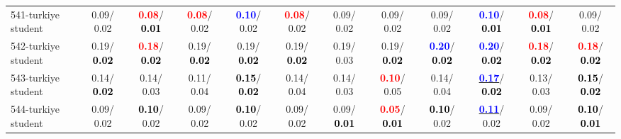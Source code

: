 \begin{table}[h]
\begin{center}
{\begin{tabular}{lc|c|c|c|c|c|c|c|c|c|c}
541-turkiye student &   0.09/  0.02 & \textcolor{red}{\textbf{  0.08}}/\textcolor{black}{\textbf{  0.01}} & \textcolor{red}{\textbf{  0.08}}/  0.02 & \textcolor{blue}{\textbf{  0.10}}/  0.02 & \textcolor{red}{\textbf{  0.08}}/  0.02 &   0.09/  0.02 &   0.09/  0.02 &   0.09/  0.02 & \textcolor{blue}{\textbf{  0.10}}/\textcolor{black}{\textbf{  0.01}} & \textcolor{red}{\textbf{  0.08}}/\textcolor{black}{\textbf{  0.01}} &   0.09/  0.02 \\
542-turkiye student &   0.19/\textcolor{black}{\textbf{  0.02}} & \textcolor{red}{\textbf{  0.18}}/\textcolor{black}{\textbf{  0.02}} &   0.19/\textcolor{black}{\textbf{  0.02}} &   0.19/\textcolor{black}{\textbf{  0.02}} &   0.19/\textcolor{black}{\textbf{  0.02}} &   0.19/  0.03 &   0.19/\textcolor{black}{\textbf{  0.02}} & \textcolor{blue}{\textbf{  0.20}}/\textcolor{black}{\textbf{  0.02}} & \textcolor{blue}{\textbf{  0.20}}/\textcolor{black}{\textbf{  0.02}} & \textcolor{red}{\textbf{  0.18}}/\textcolor{black}{\textbf{  0.02}} & \textcolor{red}{\textbf{  0.18}}/\textcolor{black}{\textbf{  0.02}} \\
543-turkiye student &   0.14/\textcolor{black}{\textbf{  0.02}} &   0.14/  0.03 &   0.11/  0.04 & \textcolor{black}{\textbf{  0.15}}/\textcolor{black}{\textbf{  0.02}} &   0.14/  0.04 &   0.14/  0.03 & \textcolor{red}{\textbf{  0.10}}/  0.05 &   0.14/  0.04 & \underline{\textcolor{blue}{\textbf{  0.17}}}/\textcolor{black}{\textbf{  0.02}} &   0.13/  0.03 & \textcolor{black}{\textbf{  0.15}}/\textcolor{black}{\textbf{  0.02}} \\
544-turkiye student &   0.09/  0.02 & \textcolor{black}{\textbf{  0.10}}/  0.02 &   0.09/  0.02 & \textcolor{black}{\textbf{  0.10}}/  0.02 &   0.09/  0.02 &   0.09/\textcolor{black}{\textbf{  0.01}} & \textcolor{red}{\textbf{  0.05}}/\textcolor{black}{\textbf{  0.01}} & \textcolor{black}{\textbf{  0.10}}/  0.02 & \underline{\textcolor{blue}{\textbf{  0.11}}}/  0.02 &   0.09/  0.02 & \textcolor{black}{\textbf{  0.10}}/\textcolor{black}{\textbf{  0.01}} \\\end{tabular}}\label{stratsALCKappa16AllReduxHalfa}
\end{center}
\end{table}

